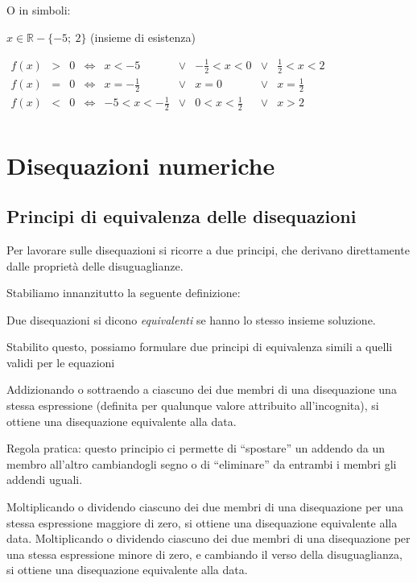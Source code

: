 O in simboli:

$x \in \mathbb{R} - \{ -5;~2 \}$ (insieme di esistenza)

$\begin{array}{cccccccccc}
f(x) & > & 0 & \Leftrightarrow &
 x < -5 & \lor & -\frac{1}{2} < x < 0 & \lor & \frac{1}{2} < x < 2 \\

f(x) & = & 0 & \Leftrightarrow &
 x = -\frac{1}{2} & \lor & x = 0 & \lor & x = \frac{1}{2} \\

f(x) & < & 0 & \Leftrightarrow &
 -5 < x < -\frac{1}{2} & \lor & 0 < x < \frac{1}{2} & \lor & x > 2 \\
\end{array}$

\section{Disequazioni numeriche}
\label{sec:dis_numeriche}

\subsection{Principi di equivalenza delle disequazioni}

Per lavorare sulle disequazioni si ricorre a due principi, che derivano
direttamente dalle proprietà delle disuguaglianze.

Stabiliamo innanzitutto la seguente definizione:

\begin{definizione}
Due disequazioni si dicono \emph{equivalenti} se hanno lo
stesso insieme soluzione.
\end{definizione}

Stabilito questo, possiamo formulare due principi di equivalenza
simili a quelli validi per le equazioni

\begin{principio}[I principio]
\label{ppd}
Addizionando o sottraendo a ciascuno dei due membri di
una disequazione una stessa espressione (definita per qualunque
valore attribuito all'incognita), si ottiene una
disequazione equivalente alla data.
\end{principio}

Regola pratica: questo principio ci permette di
``spostare'' un addendo da un membro
all'altro cambiandogli segno o di
``eliminare'' da entrambi i membri
gli addendi uguali.

\begin{principio}[II principio]
Moltiplicando o dividendo ciascuno dei due membri di
una disequazione per una stessa espressione maggiore di zero,
si ottiene una disequazione equivalente alla data.
Moltiplicando o dividendo ciascuno dei due membri di
una disequazione per una stessa espressione minore di zero,
e cambiando il verso della disuguaglianza,
si ottiene una disequazione equivalente alla data.
\end{principio}

